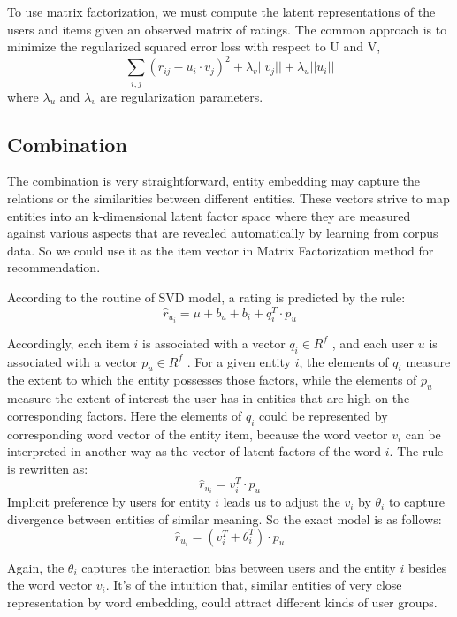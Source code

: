 \documentclass{template}
\begin{document}
To use matrix factorization, we must compute the latent representations of the users and items given an observed matrix of ratings.
The common approach is to minimize the regularized squared error loss with respect to U and V,
\begin{equation}
\sum_{i,j} (r_{ij} - u_i \cdot v_j )^2 + \lambda_v||v_j|| + \lambda_u||u_i||
\end{equation}
where $\lambda_u$ and  $\lambda_v$ are regularization parameters.

\subsection{Combination}
The combination is very straightforward, entity embedding may capture the relations or the similarities between different entities. These vectors strive to map entities into an k-dimensional latent factor space where they are measured against various aspects that are revealed automatically by learning from corpus data. So we could use it as the item vector in Matrix Factorization method for recommendation.

According to the routine of SVD model, a rating is predicted by the rule:
\begin{equation}
\hat{r}_{u_i} = \mu+ b_u+ b_i+ q_i^T\cdot p_u
\end{equation}

Accordingly, each item $i$ is associated with a vector $q_i \in R^f$ , and each user $u$ is associated with a vector $p_u \in R^f$ . For a given entity $i$, the elements of $q_i$ measure the extent to which the entity possesses those factors, while the elements of $p_u$ measure the extent of interest the user has in entities that are high on the corresponding factors. Here the elements of $q_i$ could be represented by corresponding word vector of the entity item, because the word vector $v_i$ can be interpreted in another way as the vector of latent factors of the word $i$.
The rule is rewritten as:
\begin{equation}
\hat{r}_{u_i} = v_i^T\cdot p_u
\end{equation}
Implicit preference by users for entity $i$ leads us to adjust the $v_i$ by $\theta_i$ to capture divergence between entities of similar meaning.
So the exact model is as follows:
\begin{equation}
\hat{r}_{u_i} = (v_i^T + \theta_i^T) \cdot p_u
\end{equation}

Again, the $\theta_i$ captures the interaction bias between users and the entity $i$ besides the word vector $v_i$. It's of the intuition that, similar entities of very close representation by word embedding, could attract different kinds of user groups. 
\end{document}
